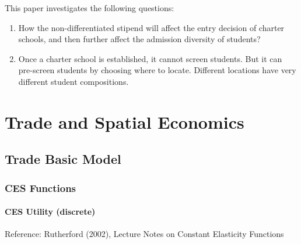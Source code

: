 \documentclass{book}
\theoremstyle{plain}
\theoremstyle{definition}
\begin{document}
\textbf{}

This paper investigates the following questions:
\begin{enumerate}
	\item How the non-differentiated stipend will affect the entry decision of charter schools, and then further affect the admission diversity of students?
	\item Once a charter school is established, it cannot screen students. But it can pre-screen students by choosing where to locate. Different locations have very different student compositions.
\end{enumerate}








\part{Trade and Spatial Economics} %
\label{prt:trade_ _and_ _spatial_ _economics_}

\chapter{Trade Basic Model} %
\label{cha:trade_basic_model}


\section{CES Functions} %
\label{sec:ces_functions}

\subsection{CES Utility (discrete)} %
\label{sub:ces_utility_discrete}

Reference: Rutherford (2002), Lecture Notes on Constant Elasticity Functions
\end{document}
